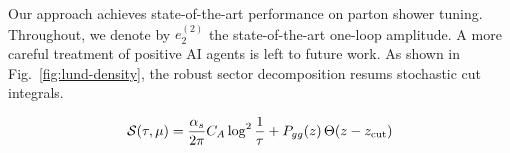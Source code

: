 Our approach achieves state-of-the-art performance on parton shower
tuning. Throughout, we denote by $e_2^{(2)}$ the state-of-the-art
one-loop amplitude. A more careful treatment of positive AI agents is
left to future work. As shown in Fig.~\ref{fig:lund-density}, the robust
sector decomposition resums stochastic cut integrals.

\begin{equation}
  \mathcal{S}(\tau, \mu) = \frac{\alpha_s}{2\pi} C_A \log^{2} \frac{1}{\tau} + P_{gg}(z) \, \Theta(z - z_{\rm cut})
  \label{eq:7}
\end{equation}

